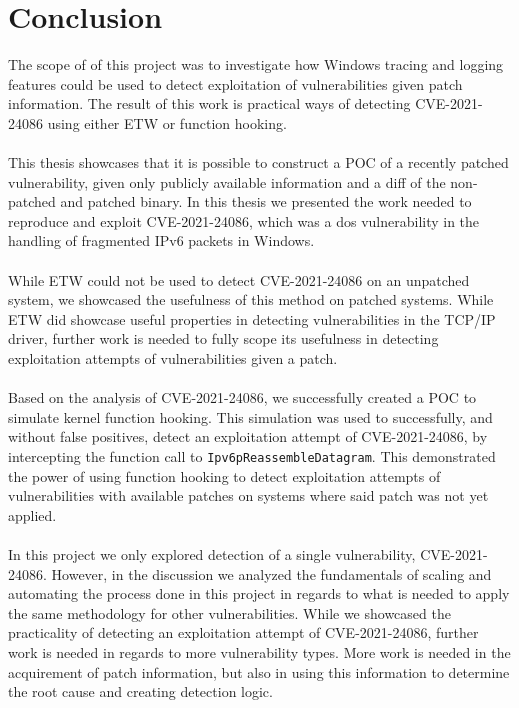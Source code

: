 \documentclass{report}
\begin{document}
\chapter{Conclusion}
The scope of of this project was to investigate how Windows tracing and logging features could be used to detect exploitation of vulnerabilities given patch information. The result of this work is practical ways of detecting CVE-2021-24086 using either \gls{ETW} or function hooking.
\\
\\
This thesis showcases that it is possible to construct a \gls{POC} of a recently patched vulnerability, given only publicly available information and a diff of the non-patched and patched binary. In this thesis we presented the work needed to reproduce and exploit CVE-2021-24086, which was a \gls{dos} vulnerability in the handling of fragmented IPv6 packets in Windows.
\\
\\
While \gls{ETW} could not be used to detect CVE-2021-24086 on an unpatched system, we showcased the usefulness of this method on patched systems. While \gls{ETW} did showcase useful properties in detecting vulnerabilities in the TCP/IP driver, further work is needed to fully scope its usefulness in detecting exploitation attempts of vulnerabilities given a patch.
\\
\\
Based on the analysis of CVE-2021-24086, we successfully created a \gls{POC} to simulate kernel function hooking. This simulation was used to successfully, and without false positives, detect an exploitation attempt of CVE-2021-24086, by intercepting the function call to \texttt{Ipv6pReassembleDatagram}. This demonstrated the power of using function hooking to detect exploitation attempts of vulnerabilities with available patches on systems where said patch was not yet applied.
\\
\\
In this project we only explored detection of a single vulnerability, CVE-2021-24086. However, in the discussion we analyzed the fundamentals of scaling and automating the process done in this project in regards to what is needed to apply the same methodology for other vulnerabilities. While we showcased the practicality of detecting an exploitation attempt of CVE-2021-24086, further work is needed in regards to more vulnerability types. More work is needed in the acquirement of patch information, but also in using this information to determine the root cause and creating detection logic.
\end{document}
